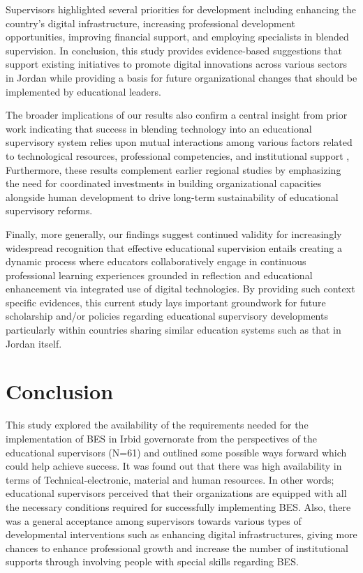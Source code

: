 \documentclass[10pt]{NSP1}
\begin{document}
Supervisors highlighted several priorities for development including enhancing the country's digital infrastructure, increasing professional development opportunities, improving financial support, and employing specialists in blended supervision. In conclusion, this study provides evidence-based suggestions that support existing initiatives to promote digital innovations across various sectors in Jordan while providing a basis for future organizational changes that should be implemented by educational leaders.

The broader implications of our results also confirm a central insight from prior work indicating that success in blending technology into an educational supervisory system relies upon mutual interactions among various factors related to technological resources, professional competencies, and institutional support , Furthermore, these results complement earlier regional studies by emphasizing the need for coordinated investments in building organizational capacities alongside human development to drive long-term sustainability of educational supervisory reforms.

Finally, more generally, our findings suggest continued validity for increasingly widespread recognition that effective educational supervision entails creating a dynamic process where educators collaboratively engage in continuous professional learning experiences grounded in reflection and educational enhancement via integrated use of digital technologies. By providing such context specific evidences, this current study lays important groundwork for future scholarship and/or policies regarding educational supervisory developments particularly within countries sharing similar education systems such as that in Jordan itself.

\section{Conclusion}

This study explored the availability of the requirements needed for the implementation of BES in Irbid governorate from the perspectives of the educational supervisors (N=61) and outlined some possible ways forward which could help achieve success. It was found out that there was high availability in terms of Technical-electronic, material and human resources. In other words; educational supervisors perceived that their organizations are equipped with all the necessary conditions required for successfully implementing BES. Also, there was a general acceptance among supervisors towards various types of developmental interventions such as enhancing digital infrastructures, giving more chances to enhance professional growth and increase the number of institutional supports through involving people with special skills regarding BES.
\end{document}
